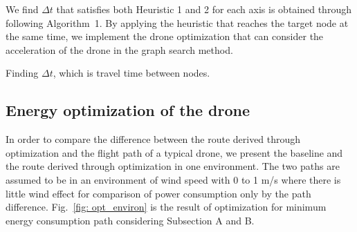 \documentclass[journal]{./template/IEEEtran}
\begin{document}
We find $\Delta t$ that satisfies both Heuristic 1 and 2 for each axis is obtained through following Algorithm~1. By applying the heuristic that reaches the target node at the same time, we implement the drone optimization that can consider the acceleration of the drone in the graph search method.

\begin{algorithm}[ht]
 \caption{Finding $\Delta t$, which is travel time between nodes.}
\end{algorithm}

\subsection{Energy optimization of the drone}

In order to compare the difference between the route derived through optimization and the flight path of a typical drone, we present the baseline and the route derived through optimization in one environment.
The two paths are assumed to be in an environment of wind speed with 0 to 1 m/s where there is little wind effect for comparison of power consumption only by the path difference.
Fig.~\ref{fig: opt_environ} is the result of optimization for minimum energy consumption path considering Subsection A and B.
\end{document}
